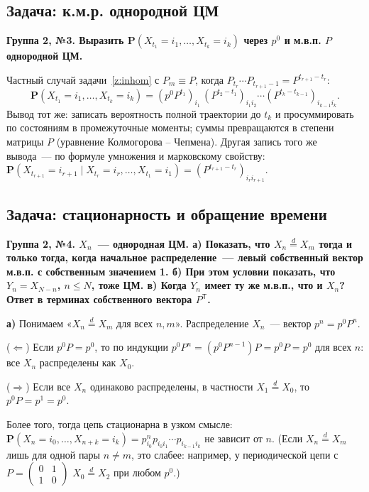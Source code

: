 \documentclass[11pt,a4paper]{article}
\theoremstyle{definition}
\newcommand{\PP}{\mathbf P}
\newcommand{\1}{\mathbf 1}
\newcommand{\eqd}{\overset{d}{=}}
\newenvironment{task}[1]{\par\medskip\noindent\colorbox{black!7}{\parbox{\dimexpr\linewidth-2\fboxsep}{\textbf{#1}}}\par\smallskip}{\par}
\begin{document}
\subsection{Задача: к.м.р. однородной ЦМ}\label{z:hom}

\begin{task}{Группа 2, №3. Выразить $\PP(X_{t_1}=i_1,\dots,X_{t_k}=i_k)$ через
$p^0$ и м.в.п. $P$ однородной ЦМ.}
\end{task}
Частный случай задачи~\ref{z:inhom} с $P_m\equiv P$, когда
$P_{t_r}\cdots P_{t_{r+1}-1}=P^{t_{r+1}-t_r}$:
\[
\boxed{\PP(X_{t_1}=i_1,\dots,X_{t_k}=i_k)=(p^0P^{t_1})_{i_1}\,(P^{t_2-t_1})_{i_1i_2}\cdots(P^{t_k-t_{k-1}})_{i_{k-1}i_k}.}
\]
Вывод тот же: записать вероятность полной траектории до $t_k$ и просуммировать
по состояниям в промежуточные моменты; суммы превращаются в степени матрицы
$P$ (уравнение Колмогорова -- Чепмена). Другая запись того же вывода~--- по
формуле умножения и марковскому свойству:
$\PP(X_{t_{r+1}}=i_{r+1}\mid X_{t_r}=i_r,\dots,X_{t_1}=i_1)=(P^{t_{r+1}-t_r})_{i_ri_{r+1}}$.

\subsection{Задача: стационарность и обращение времени}\label{z:station}

\begin{task}{Группа 2, №4. $X_n$~--- однородная ЦМ. а) Показать, что $X_n\eqd X_m$
тогда и только тогда, когда начальное распределение~--- левый собственный
вектор м.в.п. с собственным значением 1. б) При этом условии показать, что
$Y_n=X_{N-n}$, $n\le N$, тоже ЦМ. в) Когда $Y_n$ имеет ту же м.в.п., что и $X_n$?
Ответ в терминах собственного вектора $P^{\mathsf T}$.}
\end{task}

\textbf{а)} Понимаем «$X_n\eqd X_m$ для всех $n,m$». Распределение $X_n$~---
вектор $p^n=p^0P^n$.

($\Leftarrow$) Если $p^0P=p^0$, то по индукции
$p^0P^n=(p^0P^{n-1})P=p^0P=p^0$ для всех $n$: все $X_n$ распределены как $X_0$.

($\Rightarrow$) Если все $X_n$ одинаково распределены, в частности
$X_1\eqd X_0$, то $p^0P=p^1=p^0$.

Более того, тогда цепь стационарна в узком смысле:
$\PP(X_n=i_0,\dots,X_{n+k}=i_k)=p^n_{i_0}p_{i_0i_1}\cdots p_{i_{k-1}i_k}$
не зависит от $n$. (Если $X_n\eqd X_m$ лишь для одной пары $n\ne m$, это
слабее: например, у периодической цепи с $P=\begin{pmatrix}0&1\\1&0\end{pmatrix}$
$X_0\eqd X_2$ при любом $p^0$.)
\end{document}
